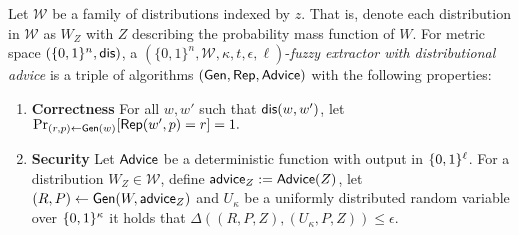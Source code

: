 \begin{definition}
\label{def:fe distributional}
Let $\mathcal{W}$ be a family of distributions indexed by $z$.  That is, denote each distribution in $\mathcal{W}$ as $W_Z$ with $Z$ describing the probability mass function of $W$.  
For metric space $(\{0,1\}^n, \mathsf{dis})$, a $(\{0,1\}^n, \mathcal{W}, \kappa, t, \epsilon, \ell)$-\emph{fuzzy extractor with distributional advice} is a triple of algorithms $({\mathsf{Gen}}, {\mathsf{Rep}}, {\mathsf{Advice}})$ with the following properties:
\begin{enumerate} 
\itemsep0em
\item \textbf{Correctness} For all $w, w'$ such that $\mathsf{dis}(w, w')$, let $\Pr_{(r, p) \leftarrow {\ensuremath{\mathsf{Gen}}}(w)}[{\mathsf{Rep}}(w', p) = r]=1.$
\item \textbf{Security} Let ${\mathsf{Advice}}$ be a deterministic function with output in $\{0, 1\}^\ell$.  For a distribution $W_Z \in \mathcal{W}$, define ${\mathsf{advice}}_Z:= {\mathsf{Advice}}(Z)$, let $(R, P) \leftarrow {\ensuremath{\mathsf{Gen}}}(W, {\mathsf{advice}}_Z)$ and $U_\kappa$ be a uniformly distributed random variable over $\{0, 1\}^\kappa$ it holds that $\Delta((R, P, Z), (U_\kappa, P, Z))\le \epsilon.$
\end{enumerate}
\end{definition}


